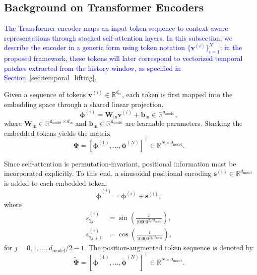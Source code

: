 \documentclass[journal]{IEEEtran}
\newcommand{\vs}{\mathbf{s}}
\newcommand{\vb}{\mathbf{b}}
\newcommand{\vphi}{\boldsymbol{\phi}}
\newcommand{\mW}{\mathbf{W}}
\newcommand{\mPhi}{\boldsymbol{\Phi}}
\begin{document}
\subsection{Background on Transformer Encoders}
\label{sec:transformer_background}

\textcolor{blue}{The Transformer encoder \cite{vaswani2017attention} maps an input token sequence to context-aware representations through stacked self-attention layers.} \textcolor{blue}{In this subsection, we describe the encoder in a generic form using token notation $\{\mathbf{v}^{(i)}\}_{i=1}^{N}$; in the proposed framework, these tokens will later correspond to vectorized temporal patches extracted from the history window, as specified in Section~\ref{sec:temporal_lifting}.}

Given a sequence of tokens $\mathbf{v}^{(i)} \in \mathbb{R}^{d_{\mathrm{in}}}$, each token is first mapped into the embedding space through a shared linear projection,
\begin{equation}
    \vphi^{(i)} = \mW_{\mathrm{in}} \mathbf{v}^{(i)} + \vb_{\mathrm{in}}
    \in \mathbb{R}^{d_{\mathrm{model}}},
    \label{eq:general_embed}
\end{equation}
where $\mW_{\mathrm{in}} \in \mathbb{R}^{d_{\mathrm{model}} \times d_{\mathrm{in}}}$ and $\vb_{\mathrm{in}} \in \mathbb{R}^{d_{\mathrm{model}}}$ are learnable parameters. Stacking the embedded tokens yields the matrix
\begin{equation}
    \mPhi = [\vphi^{(1)}, \ldots, \vphi^{(N)}]^\top
    \in \mathbb{R}^{N \times d_{\mathrm{model}}}.
\end{equation}

Since self-attention is permutation-invariant, positional information must be incorporated explicitly. To this end, a sinusoidal positional encoding $\vs^{(i)} \in \mathbb{R}^{d_{\mathrm{model}}}$ is added to each embedded token,
\begin{equation}
    \tilde{\vphi}^{(i)} = \vphi^{(i)} + \vs^{(i)},
\end{equation}
where
\begin{equation}
\begin{split}
    s^{(i)}_{2j} &= \sin\!\left(\frac{i}{10000^{2j/d_{\mathrm{model}}}}\right), \\
    s^{(i)}_{2j+1} &= \cos\!\left(\frac{i}{10000^{2j/d_{\mathrm{model}}}}\right),
\end{split}
\label{eq:pos_enc}
\end{equation}
for $j = 0,1,\ldots,d_{\mathrm{model}}/2-1$. The position-augmented token sequence is denoted by
\begin{equation}
    \widetilde{\mPhi}
    =
    [\tilde{\vphi}^{(1)}, \ldots, \tilde{\vphi}^{(N)}]^\top
    \in \mathbb{R}^{N \times d_{\mathrm{model}}}.
\end{equation}
\end{document}
